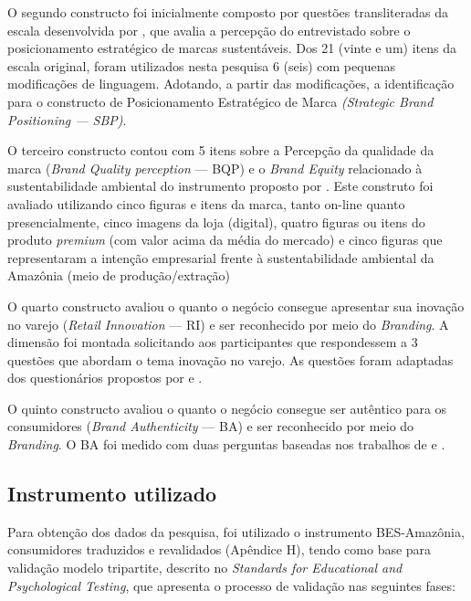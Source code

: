 O segundo constructo foi inicialmente composto por questões transliteradas da escala desenvolvida por , que avalia a percepção do entrevistado sobre o posicionamento estratégico de marcas sustentáveis. Dos 21 (vinte e um) itens da escala original, foram utilizados nesta pesquisa 6 (seis) com pequenas modificações de linguagem. Adotando, a partir das modificações, a identificação para o constructo de Posicionamento Estratégico de Marca \textit{(Strategic Brand Positioning — SBP)}.

O terceiro constructo contou com 5 itens sobre a Percepção da qualidade da marca (\textit{Brand Quality perception} — BQP) e o \textit{Brand Equity} relacionado à sustentabilidade ambiental do instrumento proposto por . Este construto foi avaliado utilizando cinco figuras e itens da marca, tanto on-line quanto presencialmente, cinco imagens da loja (digital), quatro figuras ou itens do produto \textit{premium} (com valor acima da média do mercado) e cinco figuras que representaram a intenção empresarial frente à sustentabilidade ambiental da Amazônia (meio de produção/extração)

O quarto constructo avaliou o quanto o negócio consegue apresentar sua inovação no varejo (\textit{Retail Innovation} — RI) e ser reconhecido por meio do \textit{Branding}. A dimensão foi montada solicitando aos participantes que respondessem a 3 questões que abordam o tema inovação no varejo. As questões foram adaptadas dos questionários propostos por  e .

O quinto constructo avaliou o quanto o negócio consegue ser autêntico para os consumidores (\textit{Brand Authenticity} — BA) e ser reconhecido por meio do \textit{Branding}. O BA foi medido com duas perguntas baseadas nos trabalhos de  e .
\subsection{Instrumento utilizado}

Para obtenção dos dados da pesquisa, foi utilizado o instrumento BES-Amazônia, consumidores traduzidos e revalidados (Apêndice H), tendo como base para validação modelo tripartite, descrito no \textit{Standards for Educational and Psychological Testing}\cite{Association2018}, que apresenta o processo de validação nas seguintes fases: 

